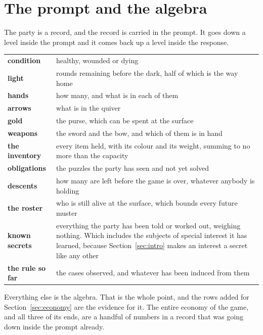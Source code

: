 \documentclass[11pt,a4paper]{article}
\begin{document}
\section{The prompt and the algebra}
\label{sec:carries}

The party is a record, and the record is carried in the prompt. It goes down a level inside the
prompt and it comes back up a level inside the response.

\begin{center}
\begin{tabular}{@{}l@{\hspace{6mm}}>{\raggedright\arraybackslash}p{}@{}}
\toprule
\textbf{condition} & healthy, wounded or dying \\
\textbf{light}     & rounds remaining before the dark, half of which is the way home \\
\textbf{hands}     & how many, and what is in each of them \\
\textbf{arrows}    & what is in the quiver \\
\textbf{gold}      & the purse, which can be spent at the surface \\
\textbf{weapons}   & the sword and the bow, and which of them is in hand \\
\textbf{the inventory} & every item held, with its colour and its weight, summing to no more than the capacity \\
\textbf{obligations} & the puzzles the party has seen and not yet solved \\
\textbf{descents}  & how many are left before the game is over, whatever anybody is holding \\
\textbf{the roster} & who is still alive at the surface, which bounds every future muster \\
\textbf{known secrets} & everything the party has been told or worked out, weighing nothing. Which includes the subjects of special interest it has learned, because Section~\ref{sec:intro} makes an interest a secret like any other \\
\textbf{the rule so far} & the cases observed, and whatever has been induced from them \\
\bottomrule
\end{tabular}
\end{center}

Everything else is the algebra. That is the whole point, and the rows added for
Section~\ref{sec:economy} are the evidence for it. The entire economy of the game, and all three
of its ends, are a handful of numbers in a record that was going down inside the prompt already.
\end{document}
